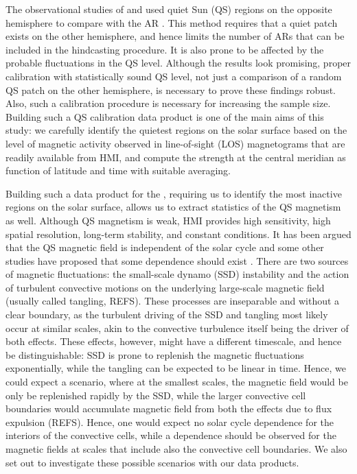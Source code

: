 \documentclass{aa}
\begin{document}
The observational studies of \cite{SRB16} and \cite{Waidele22} used quiet Sun (QS)
regions on the opposite hemisphere to compare with the AR \fff. This method
requires that a quiet patch exists on the other hemisphere, and hence 
limits the number of ARs that can be included in the hindcasting procedure. It is
also prone to be affected by the probable fluctuations in the QS
\fff level. Although the results look promising, proper calibration with
statistically sound QS level, not just a comparison of a random QS patch on the
other hemisphere, is necessary to prove these findings robust. Also,
such a calibration procedure is necessary for increasing the sample size. 
Building such a QS calibration data product is one of the main aims of this
study: we carefully identify the quietest regions on the solar surface based on the level of magnetic activity observed in
line-of-sight (LOS) magnetograms that are readily available from HMI, and
compute the \fff  strength at the central meridian as function of latitude
and time with suitable averaging. 

Building such a data product for the \fff, requiring us to identify the most
inactive regions on the solar surface, allows us to extract statistics
of the QS magnetism as well. 
Although QS magnetism is weak, HMI provides high sensitivity, high spatial
resolution, long-term stability, and constant conditions.
It has been argued that the QS magnetic field is 
independent of the solar cycle 
\cite[]{Kleint+10,Buehler+13,Faurobert+15,Jin+15a,Jin+15b} 
and some other studies have proposed
that some dependence should exist \cite[]{Lites+14,Faurobert+21}. 
There are two sources of magnetic
fluctuations: the small-scale dynamo (SSD) instability and the action of turbulent
convective motions on the underlying large-scale magnetic field (usually
called tangling, REFS). These processes are inseparable and without a clear boundary, 
as the turbulent driving of the SSD and tangling most likely occur at similar
scales, akin to the convective turbulence itself being the driver of both
effects. These effects, however, might have a different timescale, and hence
be distinguishable: SSD is prone to replenish the magnetic fluctuations 
exponentially, while the tangling can be expected to be linear in time.  
Hence, we could expect a scenario, where at the smallest scales, the magnetic
field would be only be replenished rapidly by the SSD, while the larger
convective cell boundaries would accumulate magnetic field from both the
 effects due to flux expulsion (REFS). Hence, one would expect no solar cycle
 dependence for the interiors of the convective cells, while a dependence
  should be observed for the magnetic fields at scales that include also
  the convective cell boundaries. We also set out to investigate these
  possible scenarios with our data products. 
\end{document}
